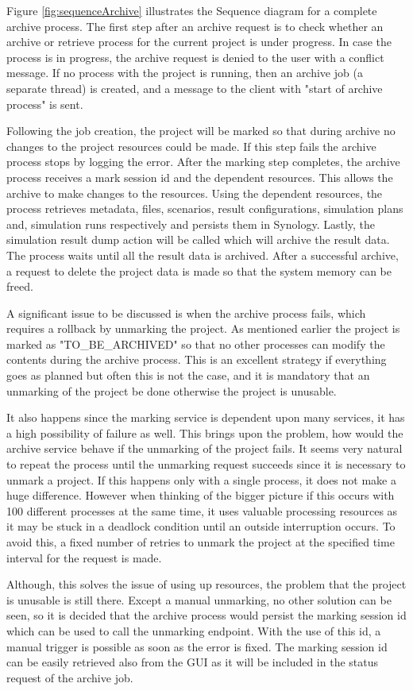 Figure \ref{fig:sequenceArchive} illustrates the Sequence diagram for a complete archive process. The first step after an archive request is to check
whether an archive or retrieve process for the current project is under progress. In case the process is in progress, the archive request is denied to the
user with a conflict message. If no process with the project is running, then an archive job (a separate thread) is created, and a message to the client with "start of archive process" is
sent. 

Following the job creation, the project will be marked so that during archive no changes to the project resources could be made. If this step fails the archive 
process stops by logging the error. After the marking step completes, the archive process receives a mark session id and the dependent resources. This allows the archive to make
changes to the resources. Using the dependent resources, the process retrieves metadata, files, scenarios, result configurations, simulation plans and, simulation runs 
respectively and persists them in Synology. Lastly, the simulation result dump action will be called which will archive the result data. The process waits until
all the result data is archived. After a successful archive, a request to delete the project data is made so that the system memory can be freed.

A significant issue to be discussed is when the archive process fails, which requires a rollback by unmarking the project. As mentioned earlier the project is
marked as "TO\_BE\_ARCHIVED" so that no other processes can modify the contents during the archive process. This is an excellent strategy if everything goes as planned but 
often this is not the case, and it is mandatory that an unmarking of the project be done otherwise the project is unusable. 

It also happens since the
marking service is dependent upon many services, it has a high possibility of failure as well. This brings upon the problem, how would the archive service behave if the
unmarking of the project fails. It seems very natural to repeat the process until the unmarking request succeeds since it is necessary to unmark
a project. If this happens only with a single process, it does not make a huge difference. However when thinking of the bigger picture if this 
occurs with 100 different processes at the same time, it uses valuable processing resources as it may be stuck in a deadlock condition until an outside interruption occurs. 
To avoid this, a fixed number of retries to unmark the project at the specified time interval for the request is made. 

Although, this solves the issue of using up resources, the problem that the project is unusable is still there. Except a manual unmarking, no other solution 
can be seen, so 
it is decided that the archive process would persist the marking session id which can be used to call the unmarking endpoint. With the use of this id, a manual 
trigger is possible as soon as the error is fixed. The marking session id can be easily retrieved also from the GUI as it will be included in the status request of
the archive job.
 